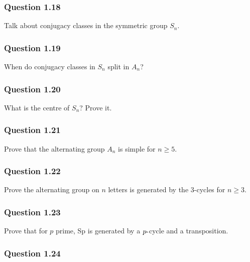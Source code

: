 \hypertarget{question-1.18}{%
\subsubsection{Question 1.18}\label{question-1.18}}

Talk about conjugacy classes in the symmetric group \(S_n\).

\hypertarget{question-1.19}{%
\subsubsection{Question 1.19}\label{question-1.19}}

When do conjugacy classes in \(S_n\) split in \(A_n\)?

\hypertarget{question-1.20}{%
\subsubsection{Question 1.20}\label{question-1.20}}

What is the centre of \(S_n\)? Prove it.

\hypertarget{question-1.21}{%
\subsubsection{Question 1.21}\label{question-1.21}}

Prove that the alternating group \(A_n\) is simple for \(n \geq 5\).

\hypertarget{question-1.22}{%
\subsubsection{Question 1.22}\label{question-1.22}}

Prove the alternating group on \(n\) letters is generated by the
3-cycles for \(n \geq 3\).

\hypertarget{question-1.23}{%
\subsubsection{Question 1.23}\label{question-1.23}}

Prove that for \(p\) prime, Sp is generated by a \(p{\hbox{-}}\)cycle
and a transposition.

\hypertarget{question-1.24}{%
\subsubsection{Question 1.24}\label{question-1.24}}

